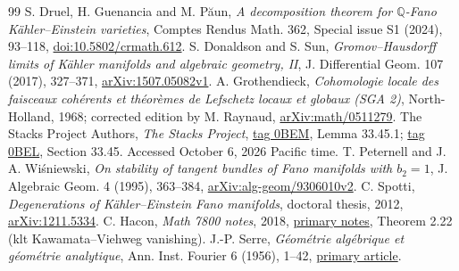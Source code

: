 \documentclass[11pt]{article}
\newcommand{\Q}{\mathbb Q}
\begin{document}
\begin{thebibliography}{99}
 S. Druel, H. Guenancia and M. P\u aun,
\emph{A decomposition theorem for $\Q$-Fano K\"ahler--Einstein varieties},
Comptes Rendus Math. 362, Special issue S1 (2024), 93--118,
\href{https://doi.org/10.5802/crmath.612}{doi:10.5802/crmath.612}.
 S. Donaldson and S. Sun,
\emph{Gromov--Hausdorff limits of K\"ahler manifolds and algebraic
geometry, II}, J. Differential Geom. 107 (2017), 327--371,
\href{https://arxiv.org/abs/1507.05082}{arXiv:1507.05082v1}.
 A. Grothendieck,
\emph{Cohomologie locale des faisceaux coh\'erents et th\'eor\`emes de
Lefschetz locaux et globaux (SGA 2)}, North-Holland, 1968;
corrected edition by M. Raynaud,
\href{https://arxiv.org/abs/math/0511279}{arXiv:math/0511279}.
 The Stacks Project Authors, \emph{The Stacks Project},
\href{https://stacks.math.columbia.edu/tag/0BEM}{tag 0BEM},
Lemma 33.45.1; \href{https://stacks.math.columbia.edu/tag/0BEL}{tag 0BEL},
Section 33.45. Accessed October 6, 2026 Pacific time.
 T. Peternell and J. A. Wi\'sniewski,
\emph{On stability of tangent bundles of Fano manifolds with $b_2=1$},
J. Algebraic Geom. 4 (1995), 363--384,
\href{https://arxiv.org/abs/alg-geom/9306010}{arXiv:alg-geom/9306010v2}.
 C. Spotti, \emph{Degenerations of K\"ahler--Einstein
Fano manifolds}, doctoral thesis, 2012,
\href{https://arxiv.org/abs/1211.5334}{arXiv:1211.5334}.
 C. Hacon, \emph{Math 7800 notes}, 2018,
\href{https://www.math.utah.edu/~hacon/7800/Math7800-2018.pdf}{primary notes},
Theorem 2.22 (klt Kawamata--Viehweg vanishing).
 J.-P. Serre, \emph{G\'eom\'etrie alg\'ebrique et
g\'eom\'etrie analytique}, Ann. Inst. Fourier 6 (1956), 1--42,
\href{https://www.numdam.org/article/AIF_1956__6__1_0.pdf}{primary article}.
\end{thebibliography}
\end{document}
